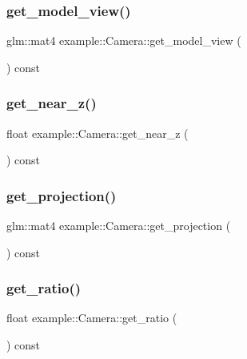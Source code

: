 \subsubsection{get\_model\_view()}
{\footnotesize\ttfamily glm\+::mat4 example\+::\+Camera\+::get\+\_\+model\+\_\+view (\begin{DoxyParamCaption}{ }\end{DoxyParamCaption}) const\hspace{0.3cm}{\ttfamily [inline]}}

\mbox{\label{classexample_1_1_camera_ae61da628123c5b4c6f37913c2f640604}} 
\subsubsection{get\_near\_z()}
{\footnotesize\ttfamily float example\+::\+Camera\+::get\+\_\+near\+\_\+z (\begin{DoxyParamCaption}{ }\end{DoxyParamCaption}) const\hspace{0.3cm}{\ttfamily [inline]}}

\mbox{\label{classexample_1_1_camera_ab30b27febf3449c284eba6bb0d693910}} 
\subsubsection{get\_projection()}
{\footnotesize\ttfamily glm\+::mat4 example\+::\+Camera\+::get\+\_\+projection (\begin{DoxyParamCaption}{ }\end{DoxyParamCaption}) const\hspace{0.3cm}{\ttfamily [inline]}}

\mbox{\label{classexample_1_1_camera_a422ce687afdc941ca49fe54527bcd424}} 
\subsubsection{get\_ratio()}
{\footnotesize\ttfamily float example\+::\+Camera\+::get\+\_\+ratio (\begin{DoxyParamCaption}{ }\end{DoxyParamCaption}) const\hspace{0.3cm}{\ttfamily [inline]}}

